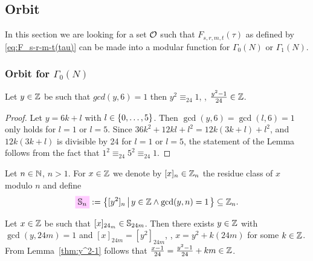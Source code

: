\documentclass{article}
\begin{document}
\subsection{Orbit}

In this section we are looking for a set $\mathcal{O}_{}$ such that
$F_{s,r,m,t}(\tau)$ as defined by \eqref{eq:F_s-r-m-t(tau)} can be
made into a modular function for $\Gamma_0(N)$ or $\Gamma_1(N)$.

\subsubsection{Orbit for $\Gamma_0(N)$}

\begin{AdditionalInformation}
\begin{Lemma}\label{thm:y^2-1}
  Let $y\in \mathbb{Z}$ be such that $gcd(y, 6)=1$ then
  $y^2 \equiv_{24} 1$, \ie, $ \frac{y^2-1}{24} \in \mathbb{Z}$.
\end{Lemma}
\begin{proof}
  Let $y = 6k + l$ with $l \in \left\{0,\ldots,5\right\}$. Then
  $\gcd(y, 6)=\gcd(l,6)=1$ only holds for $l=1$ or $l=5$.
  Since $36 k^2 + 12 k l + l^2 = 12k(3k+l) + l^2$, and $12k(3k+l)$ is
  divisible by 24 for $l=1$ or $l=5$, the statement of the Lemma
  follows from the fact that $1^2\equiv_{24} 5^2 \equiv_{24} 1$.
\end{proof}
\end{AdditionalInformation}


\begin{Definition}\cite[Def.~40]{Radu_RamanujanKolberg_2015}
  Let $n \in \mathbb{N}$, $n>1$. For $x \in \mathbb{Z}$ we denote by
  $[x]_n\in \mathbb{Z}_n$ the residue class of $x$ modulo $n$ and define
  \begin{gather*}
    \defineNotation[S-n]{\setS_{n}}
    :=
    \SetDef{[y^2]_n}{y \in \setZ \land \gcd(y, n)=1}
    \subseteq
    \setZ_n.
  \end{gather*}
\end{Definition}

\begin{AdditionalInformation}
Let $x \in \mathbb{Z}$ be such that $[x]_{24_m} \in \mathbb{S}_{24m}$. Then
there exists $y \in \mathbb{Z}$ with $\gcd(y, 24m)=1$ and
$[x]_{24m}=[y^2]_{24m}$, \ie, $x = y^2 + k (24m)$ for some $k\in
\mathbb{Z}$. From Lemma~\ref{thm:y^2-1} follows that
$\frac{x-1}{24}=\frac{y^2-1}{24} + km \in\mathbb{Z}$.
\end{AdditionalInformation}
\end{document}
